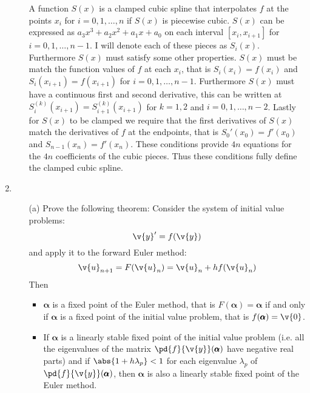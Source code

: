\documentclass[11pt]{article}
\begin{document}
\begin{enumerate}
\begin{enumerate}
                A function $S(x)$ is a clamped cubic spline that interpolates $f$
                at the points $x_i$ for $i = 0, 1, \ldots, n$ if $S(x)$ is piecewise
                cubic.
                $S(x)$ can be expressed as $a_3 x^3 + a_2 x^2 + a_1 x + a_0$ on each
                interval $[x_i, x_{i+1}]$ for $i = 0, 1, \ldots, n-1$.
                I will denote each of these pieces as $S_i(x)$.
                Furthermore $S(x)$ must satisfy some other properties.
                $S(x)$ must be match the function values of $f$ at each $x_i$,
                that is $S_i(x_i) = f(x_i)$ and $S_i(x_{i+1}) = f(x_{i+1})$
                for $i = 0, 1, \ldots, n-1$.
                Furthermore $S(x)$ must have a continuous
                first and second derivative, this can be written at
                $S_i^{(k)}(x_{i+1}) = S_{i+1}^{(k)}(x_{i+1})$ for $k = 1, 2$ and
                $i = 0, 1, \ldots, n - 2$.
                Lastly for $S(x)$ to be clamped we require that the first
                derivatives of $S(x)$ match the derivatives of $f$ at the
                endpoints, that is $S_0'(x_0) = f'(x_0)$ and
                $S_{n-1}(x_n) = f'(x_n)$.
                These conditions provide $4n$ equations for the $4n$ coefficients
                of the cubic pieces.
                Thus these conditions fully define the clamped cubic spline.
        \end{enumerate}

    \item %
        \begin{enumerate}
            \item[(a)] %
                Prove the following theorem: Consider the system of initial
                value problems:
                \[
                    \v{y}' = f(\v{y})
                \]
                and apply it to the forward Euler method:
                \[
                    \v{u}_{n+1} = F(\v{u}_n) = \v{u}_n + h f(\v{u}_n)
                \]
                Then
                \begin{itemize}
                    \item
                        $\pmb{\alpha}$ is a fixed point of the Euler method,
                        that is $F(\pmb{\alpha}) = \pmb{\alpha}$ if and only if
                        $\pmb{\alpha}$ is a fixed point of the initial value
                        problem, that is $f(\pmb{\alpha}) = \v{0}$.

                    \item 
                        If $\pmb{\alpha}$ is a linearly stable fixed point of the
                        initial value problem (i.e. all the eigenvalues of the matrix
                        $\pd{f}{\v{y}}(\pmb{\alpha})$ have negative real parts) and if
                        $\abs{1 + h \lambda_p} < 1$ for each eigenvalue
                        $\lambda_p$ of $\pd{f}{\v{y}}(\pmb{\alpha})$, then
                        $\pmb{\alpha}$ is also a linearly stable fixed point of
                        the Euler method.
                \end{itemize}


\end{enumerate}
\end{enumerate}
\end{document}
